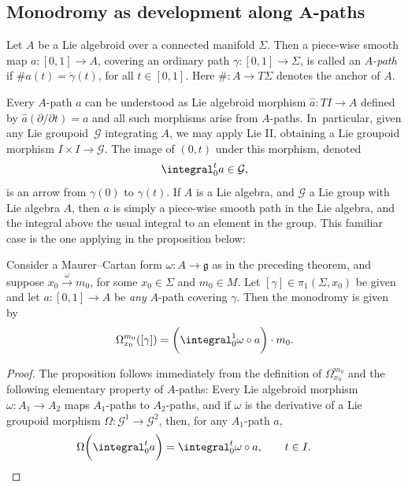 \subsection*{Monodromy as development along $\boldsymbol{A}$-paths}

Let $A$ be a Lie algebroid over a connected manifold $\Sigma $. Then a
piece-wise smooth map $a \colon [0,1] \allowbreak\rightarrow A$, covering an
ordinary path $\gamma \colon [0,1] \rightarrow \Sigma $, is called an
{\it $A$-path} if $\# a(t) = \dot \gamma(t)$, for all $t \in
[0,1]$. Here $\# \colon A \rightarrow T \Sigma $ denotes the anchor of
$A$.

Every $A$-path $a$ can be understood as Lie algebroid morphism $\hat a
\colon {T}I \rightarrow A$ defined by $\hat a (\partial/\partial t)=a$
and all such morphisms arise from $A$-paths. In~particular, given any
Lie groupoid~${\mathcal G} $ integrating $A$, we may apply Lie II,
obtaining a Lie groupoid morphism $I \times I \rightarrow {\mathcal G}
$. The image of $(0, t)$ under this morphism, denoted
\begin{equation*}
\integral_0^t a \in {\mathcal G},
\end{equation*} is an arrow from $\gamma(0)$ to $\gamma(t)$. If $A$ is
a Lie algebra, and ${\mathcal G} $ a Lie group with Lie algebra $A$, then
$a$ is simply a piece-wise smooth path in the Lie algebra, and the
integral above the usual integral to an element in the group. This
familiar case is the one applying in the proposition below:

\begin{Proposition}%
Consider a Maurer--Cartan form $\omega \colon A
 \rightarrow {\mathfrak g} $ as in the preceding theorem, and suppose
 $x_0\xrightarrow{\omega}m_0$, for some $x_0 \in \Sigma $ and
 $m_0 \in M$. Let $[\gamma] \in \pi_1(\Sigma,x_0)$ be given and let
 $a \colon [0,1]\rightarrow A$ be {\em any} $A$-path covering
 $\gamma $. Then the monodromy is given by
 \[
 \Omega_{x_0}^{m_0}([\gamma])=\bigg(\integral_0^1 \omega \circ a\bigg)\cdot m_0.
\]
\end{Proposition}
%
\begin{proof} The proposition follows immediately from the definition
of $\Omega_{x_0}^{m_0}$ and the following ele\-mentary property of
$A$-paths: Every Lie algebroid morphism $\omega \colon A_1 \rightarrow
A_2$ maps $A_1$-paths to $A_2$-paths, and if $\omega $ is the
derivative of a Lie groupoid morphism $\Omega \colon {\mathcal G}^1
\rightarrow {\mathcal G}^2$, then, for any $A_1$-path $a$,
 \begin{equation*}
 \Omega \bigg(\integral_0^t a\bigg) =
\integral_0^t \omega \circ a, \qquad t \in I.\tag*{\qed}
 \end{equation*}\renewcommand{\qed}{}
\end{proof}
